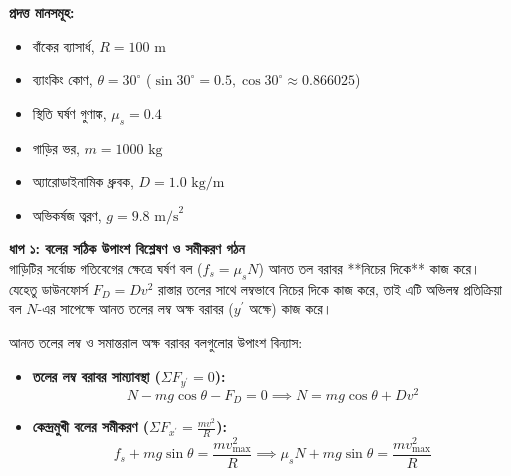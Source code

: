\documentclass[12pt, a4paper]{article}
\begin{document}
\begin{tcolorbox}[solutionbox={সমাধান (Solution)}]
\noindent
\textbf{প্রদত্ত মানসমূহ:}
\begin{itemize}[leftmargin=*, parsep=0.3ex]
    \item বাঁকের ব্যাসার্ধ, $R = 100\text{ m}$
    \item ব্যাংকিং কোণ, $\theta = 30^\circ$ ($\sin 30^\circ = 0.5, \cos 30^\circ \approx 0.866025$)
    \item স্থিতি ঘর্ষণ গুণাঙ্ক, $\mu_s = 0.4$
    \item গাড়ির ভর, $m = 1000\text{ kg}$
    \item অ্যারোডাইনামিক ধ্রুবক, $D = 1.0\text{ kg/m}$
    \item অভিকর্ষজ ত্বরণ, $g = 9.8\text{ m/s}^2$
\end{itemize}

\vspace{0.5em}
\noindent
\textbf{ধাপ ১: বলের সঠিক উপাংশ বিশ্লেষণ ও সমীকরণ গঠন} \\
গাড়িটির সর্বোচ্চ গতিবেগের ক্ষেত্রে ঘর্ষণ বল ($f_s = \mu_s N$) আনত তল বরাবর **নিচের দিকে** কাজ করে। যেহেতু ডাউনফোর্স $F_D = Dv^2$ রাস্তার তলের সাথে লম্বভাবে নিচের দিকে কাজ করে, তাই এটি অভিলম্ব প্রতিক্রিয়া বল $N$-এর সাপেক্ষে আনত তলের লম্ব অক্ষ বরাবর ($y^\prime$ অক্ষে) কাজ করে।

আনত তলের লম্ব ও সমান্তরাল অক্ষ বরাবর বলগুলোর উপাংশ বিন্যাস:
\begin{itemize}[leftmargin=*, parsep=0.3ex]
    \item \textbf{তলের লম্ব বরাবর সাম্যাবস্থা ($\Sigma F_{y^\prime} = 0$):} 
    $$N - mg \cos\theta - F_D = 0 \implies N = mg \cos\theta + Dv^2$$
    \item \textbf{কেন্দ্রমুখী বলের সমীকরণ ($\Sigma F_{x^\prime} = \frac{m v^2}{R}$):} 
    $$f_s + mg \sin\theta = \frac{m v_{\text{max}}^2}{R} \implies \mu_s N + mg \sin\theta = \frac{m v_{\text{max}}^2}{R}$$
\end{itemize}

\vspace{1em}
\begin{center}
\end{center}
\end{tcolorbox}
\end{document}
